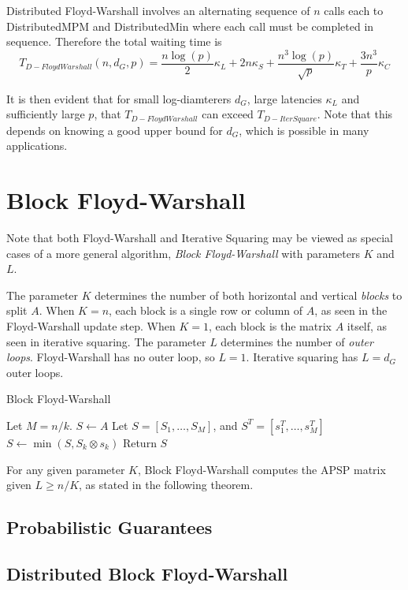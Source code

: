 \documentclass{article} %
\begin{document}
Distributed Floyd-Warshall involves an alternating sequence of $n$ calls each to {\sc DistributedMPM} and {\sc DistributedMin}
where each call must be completed in sequence.  Therefore the total waiting time is
\[
T_{D-FloydWarshall}(n, d_G, p) =  \frac{n \log(p)}{2}\kappa_L + 2n\kappa_S +  \frac{n^3\log(p)}{\sqrt{p}}\kappa_T + \frac{3n^3}{p}\kappa_C
\]

It is then evident that for small log-diamterers $d_G$, large
latencies $\kappa_L$ and sufficiently large $p$, that
$T_{D-FloydWarshall}$ can exceed $T_{D-IterSquare}$.  Note that this
depends on knowing a good upper bound for $d_G$, which is possible in
many applications.

\section{Block Floyd-Warshall}

Note that both Floyd-Warshall and Iterative Squaring may be viewed as
special cases of a more general algorithm, \emph{Block Floyd-Warshall}
with parameters $K$ and $L$.

The parameter $K$ determines the number of both horizontal and
vertical \emph{blocks} to split $A$.  When $K = n$, each block is a
single row or column of $A$, as seen in the Floyd-Warshall update
step.  When $K = 1$, each block is the matrix $A$ itself, as seen in
iterative squaring.  The parameter $L$ determines the number of
\emph{outer loops}.  Floyd-Warshall has no outer loop, so $L=1$.
Iterative squaring has $L = d_G$ outer loops.

\begin{algorithm}[H]
\caption{Block Floyd-Warshall}
\begin{algorithmic}
  \State Let $M = n/k$.
  \State $S \leftarrow A$
      \State Let $S = [S_1,\hdots, S_M]$, and $S^T = [s_1^T,\hdots, s_M^T]$
      \State $S \leftarrow \min(S,  S_k \otimes s_k)$
    \EndFor
  \EndFor
  \State Return $S$
\EndFunction
\end{algorithmic}
\end{algorithm}

For any given parameter $K$, Block Floyd-Warshall computes the APSP
matrix given $L \geq n/K$, as stated in the following theorem.


\subsection{Probabilistic Guarantees}

\subsection{Distributed Block Floyd-Warshall}



\end{document}
